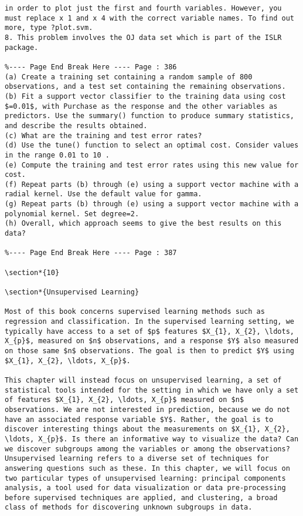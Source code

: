 \documentclass[10pt]{article}
\begin{document}
\begin{verbatim}
in order to plot just the first and fourth variables. However, you must replace x 1 and x 4 with the correct variable names. To find out more, type ?plot.svm.
8. This problem involves the OJ data set which is part of the ISLR package.

%---- Page End Break Here ---- Page : 386
(a) Create a training set containing a random sample of 800 observations, and a test set containing the remaining observations.
(b) Fit a support vector classifier to the training data using cost $=0.01$, with Purchase as the response and the other variables as predictors. Use the summary() function to produce summary statistics, and describe the results obtained.
(c) What are the training and test error rates?
(d) Use the tune() function to select an optimal cost. Consider values in the range 0.01 to 10 .
(e) Compute the training and test error rates using this new value for cost.
(f) Repeat parts (b) through (e) using a support vector machine with a radial kernel. Use the default value for gamma.
(g) Repeat parts (b) through (e) using a support vector machine with a polynomial kernel. Set degree=2.
(h) Overall, which approach seems to give the best results on this data?

%---- Page End Break Here ---- Page : 387

\section*{10}

\section*{Unsupervised Learning}

Most of this book concerns supervised learning methods such as regression and classification. In the supervised learning setting, we typically have access to a set of $p$ features $X_{1}, X_{2}, \ldots, X_{p}$, measured on $n$ observations, and a response $Y$ also measured on those same $n$ observations. The goal is then to predict $Y$ using $X_{1}, X_{2}, \ldots, X_{p}$.

This chapter will instead focus on unsupervised learning, a set of statistical tools intended for the setting in which we have only a set of features $X_{1}, X_{2}, \ldots, X_{p}$ measured on $n$ observations. We are not interested in prediction, because we do not have an associated response variable $Y$. Rather, the goal is to discover interesting things about the measurements on $X_{1}, X_{2}, \ldots, X_{p}$. Is there an informative way to visualize the data? Can we discover subgroups among the variables or among the observations? Unsupervised learning refers to a diverse set of techniques for answering questions such as these. In this chapter, we will focus on two particular types of unsupervised learning: principal components analysis, a tool used for data visualization or data pre-processing before supervised techniques are applied, and clustering, a broad class of methods for discovering unknown subgroups in data.


\end{verbatim}
\end{document}
